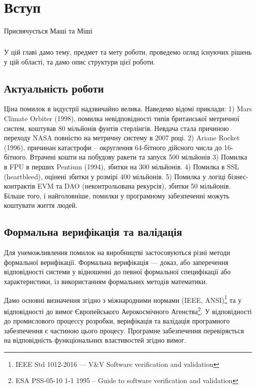 \chapter{Вступ}

\epigraph{Присвячується Маші та Міші}{}

\paragraph{}
У цій главі дамо тему, предмет та мету роботи,
проведемо огляд існуючих рішень у цій області,
та дамо опис структури цієї роботи.

\section{Актуальність роботи}
Ціна помилок в індустрії надзвичайно велика. Наведемо
відомі приклади: 1) Mars Climate Orbiter (1998), помилка невідповідності
типів британської метричної систем, коштував 80 мільйонів фунтів стерлінгів.
Невдача стала причиною переходу NASA повністю на метричну систему в 2007 році.
2) Ariane Rocket (1996), причинан катастрофи -- округлення 64-бітного дійсного
числа до 16-бітного. Втрачені кошти на побудову ракети та запуск 500 мільйонів
3) Помилка в FPU в перших Pentium (1994), збитки на 300 мільйонів.
4) Помилка в SSL (heartbleed), оцінені збитки у розмірі 400 мільйонів.
5) Помилка у логіці бізнес-контрактів EVM та
DAO (неконтрольована рекурсія), збитки 50 мільйонів.
Більше того, і найголовніше, помилки у програмному забезпеченні можуть
коштувати життя людей.

\section{Формальна верифікація та валідація}
Для унеможливлення помилок на виробництві застосовуються різні
методи формальної верифікації. Формальна верифікація — доказ, або заперечення
відповідності системи у відношенні до певної формальної специфікації або характеристики,
із використанням формальних методів математики.

Дамо основні визначення згідно з міжнародними нормами (IEEE, ANSI)\footnote{IEEE Std 1012-2016  --- V\&V Software verification and validation} та у відповідності до вимог
Європейського Аерокосмічного Агенства\footnote{ESA PSS-05-10 1-1 1995 -- Guide to software verification and validation}.
У відповідності до промислового процессу розробки, верифікація та валідація програмного
забезпечення є частиною цього процесу. Програмне забезпечення перевіряється на
відповідність функціональних властивостей згідно вимог.

